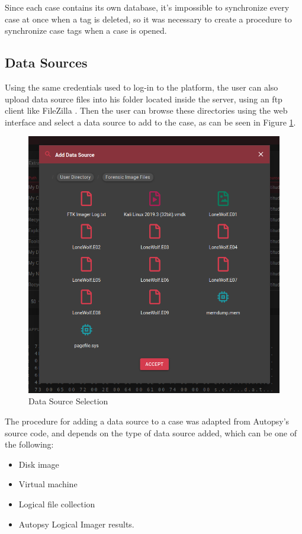 Since each case contains its own database, it's impossible to synchronize every case at once when a tag is deleted, so it was necessary to create a procedure to synchronize case tags when a case is opened.

\subsection{Data Sources}

Using the same credentials used to log-in to the platform, the user can also upload data source files into his folder located inside the server, using an \acrshort{ftp} client like FileZilla \cite{filezilla}.
Then the user can browse these directories using the web interface and select a data source to add to the case, as can be seen in Figure \ref{fig:datasource}.

\begin{figure}[ht]
 \centering
 \includegraphics[width=0.75\linewidth]{imgs/data-sources.png}
 \caption{Data Source Selection}
 \label{fig:datasource}
\end{figure}

The procedure for adding a data source to a case was adapted from Autopsy's source code, and depends on the type of data source added, which can be one of the following:
\begin{itemize}
 \item Disk image
 \item Virtual machine
 \item Logical file collection
 \item Autopsy Logical Imager \cite{imager} results.
\end{itemize}

